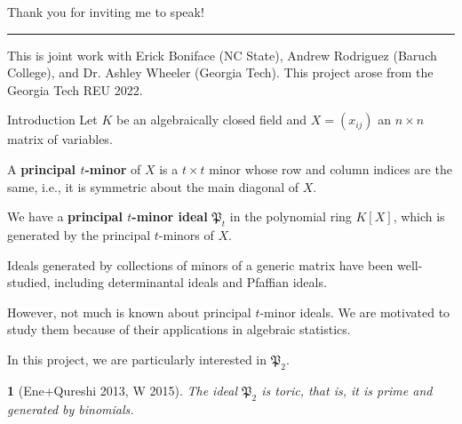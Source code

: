 \documentclass[mathserif
    , handout
   ]{beamer}
\title
{\color{GTblue}{Toric varieties given by principal 2-minor ideals}}
\subtitle{Undergraduate Mathematics Research Conference 2023}
\author[Sai Sivakumar]
{Sai Sivakumar}
\institute[Georgia Tech]{\color{GTtechgold}{Georgia Institute of Technology}}
\date{1 April 2023}
\newcommand{\pr}{\mathfrak P}
\theoremstyle{plain}
\newtheorem{thm}{\color{white}{Theorem}}[subsection]
\theoremstyle{definition}
\theoremstyle{remark}
\begin{document}
\frame{\titlepage}

\begin{frame}{}{}
{\color{GTtechgold}Thank you for inviting me to speak!}
\vspace{0.75pc}
\hrule
\pause
\vspace{0.75pc}
This is joint work with Erick Boniface (NC State), Andrew Rodriguez (Baruch College), and Dr. Ashley Wheeler (Georgia Tech).
\pause
This project arose from the Georgia Tech REU 2022. 
\end{frame}


\begin{frame}{Introduction}
Let $K$ be an algebraically closed field and $X=(x_{ij})$ an $n\times n$ matrix of variables.

\pause
\vspace{0.75pc} 
A \textbf{principal $t$-minor} of $X$ is a $t\times t$ minor whose row and column indices are the same, i.e., it is symmetric about the main diagonal of $X$. 

\pause
\vspace{0.75pc}
We have a \textbf{principal $t$-minor ideal} $\pr_t$ in the polynomial ring $K[X]$, which is generated by the principal $t$-minors of $X$. 
\end{frame}

\begin{frame}
Ideals generated by collections of minors of a generic matrix have been well-studied, including determinantal ideals and Pfaffian ideals.  

\pause 
\vspace{0.75pc}
However, not much is known about principal $t$-minor ideals.  We are motivated to study them because of their applications in algebraic statistics.

\pause
\vspace{0.75pc}
In this project, we are particularly interested in $\pr_2$.

\pause
\begin{thm}[Ene+Qureshi 2013, W 2015]
The ideal $\pr_2$ is toric, that is, it is prime and generated by binomials.
\end{thm}
\end{frame}
\end{document}
